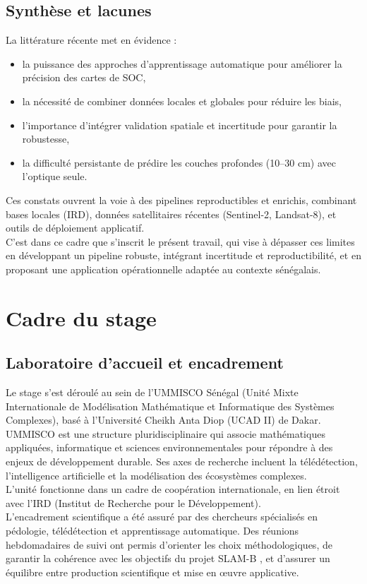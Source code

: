 \documentclass[12pt,a4paper,oneside]{report}
\begin{document}
\section{Synthèse et lacunes}
La littérature récente met en évidence :
\begin{itemize}
  \item la puissance des approches d’apprentissage automatique pour améliorer la précision des cartes de SOC,
  \item la nécessité de combiner données locales et globales pour réduire les biais,
  \item l’importance d’intégrer validation spatiale et incertitude pour garantir la robustesse,
  \item la difficulté persistante de prédire les couches profondes (10–30 cm) avec l’optique seule.
\end{itemize}
Ces constats ouvrent la voie à des pipelines reproductibles et enrichis, combinant bases locales (IRD), données satellitaires récentes (Sentinel-2, Landsat-8), et outils de déploiement applicatif.
\\
\newline
C’est dans ce cadre que s’inscrit le présent travail, qui vise à dépasser ces limites en développant un pipeline robuste, intégrant incertitude et reproductibilité, et en proposant une application opérationnelle adaptée au contexte sénégalais.

\chapter{Cadre du stage}

\section{Laboratoire d’accueil et encadrement}
Le stage s’est déroulé au sein de l’UMMISCO Sénégal \cite{org-ummisco-2025} (Unité Mixte Internationale de Modélisation Mathématique et Informatique des Systèmes Complexes), basé à l’Université Cheikh Anta Diop (UCAD II) de Dakar.
\\
\newline
UMMISCO est une structure pluridisciplinaire qui associe mathématiques appliquées, informatique et sciences environnementales pour répondre à des enjeux de développement durable. Ses axes de recherche incluent la télédétection, l’intelligence artificielle et la modélisation des écosystèmes complexes.\\
\newline
L’unité fonctionne dans un cadre de coopération internationale, en lien étroit avec l’IRD \cite{org-ird-2025} (Institut de Recherche pour le Développement).
\\
\newline
L’encadrement scientifique a été assuré par des chercheurs spécialisés en pédologie, télédétection et apprentissage automatique. Des réunions hebdomadaires de suivi ont permis d’orienter les choix méthodologiques, de garantir la cohérence avec les objectifs du projet SLAM-B \cite{org-slam-b-2025}, et d’assurer un équilibre entre production scientifique et mise en œuvre applicative.
\end{document}
